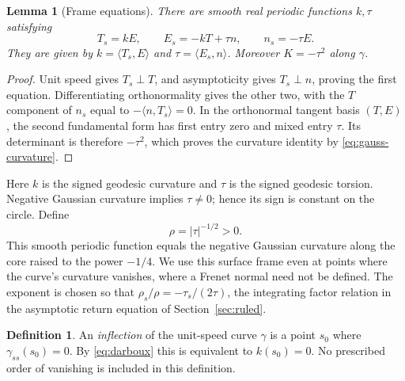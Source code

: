 \documentclass[11pt]{amsart}
\newtheorem{lemma}[theorem]{Lemma}
\theoremstyle{definition}
\newtheorem{definition}[theorem]{Definition}
\begin{document}
\begin{lemma}[Frame equations]\label{lem:frame}
There are smooth real periodic functions $k,\tau$ satisfying
\begin{equation}\label{eq:darboux}
 T_s=kE,\qquad E_s=-kT+\tau n,\qquad n_s=-\tau E.
\end{equation}
They are given by $k=\langle T_s,E\rangle$ and
$\tau=\langle E_s,n\rangle$. Moreover $K=-\tau^2$ along $\gamma$.
\end{lemma}
\begin{proof}
Unit speed gives $T_s\perp T$, and asymptoticity gives
$T_s\perp n$, proving the first equation.
Differentiating orthonormality gives the other two, with the
$T$ component of $n_s$ equal to
$-\langle n,T_s\rangle=0$.
In the orthonormal tangent basis $(T,E)$, the second fundamental
form has first entry zero and mixed entry $\tau$.
Its determinant is therefore $-\tau^2$, which proves the curvature
identity by \eqref{eq:gauss-curvature}.
\end{proof}

Here $k$ is the signed geodesic curvature and $\tau$ is the signed
geodesic torsion. Negative Gaussian curvature implies $\tau\ne0$;
hence its sign is constant on the circle. Define
\begin{equation}\label{eq:rho}
 \rho=|\tau|^{-1/2}>0.
\end{equation}
This smooth periodic function equals the negative Gaussian curvature
along the core raised to the power $-1/4$.
We use this surface frame even
at points where the curve's curvature vanishes, where a Frenet
normal need not be defined.
The exponent is chosen so that
$\rho_s/\rho=-\tau_s/(2\tau)$, the integrating factor relation
in the asymptotic return equation of Section~\ref{sec:ruled}.

\begin{definition}\label{def:inflection}
An \emph{inflection} of the unit-speed curve $\gamma$ is a point
$s_0$ where $\gamma_{ss}(s_0)=0$. By \eqref{eq:darboux} this is
equivalent to $k(s_0)=0$. No prescribed order of vanishing is
included in this definition.
\end{definition}
\end{document}
